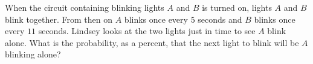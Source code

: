 When the circuit containing blinking lights $A$ and $B$ is turned on, lights $A$ and $B$ blink together. From then on $A$ blinks once every $5$ seconds and $B$ blinks once every $11$ seconds. Lindsey looks at the two lights just in time to see $A$ blink alone. What is the probability, as a percent, that the next light to blink will be $A$ blinking alone?

